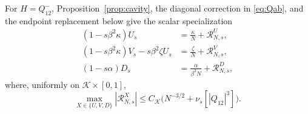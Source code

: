 \documentclass[11pt]{article}
\numberwithin{equation}{section}
\newcommand{\1}{\mathbf 1}
\newcommand{\cK}{\mathcal K}
\begin{document}
For $H=Q^-_{12}$, Proposition~\ref{prop:cavity}, the diagonal correction
in \eqref{eq:Qab}, and the endpoint replacement below give the scalar
specialization
\begin{align}
 (1-s\beta^2\kappa)U_s
 &=\frac{\kappa}{N}+\mathcal R^U_{N,s},
 \label{eq:cavity-U}\\
 (1-s\beta^2\kappa)V_s-s\beta^2\zeta U_s
 &=\frac{\zeta}{N}+\mathcal R^V_{N,s},
 \label{eq:cavity-V}\\
 (1-s\alpha)D_s
 &=\frac{\alpha}{\beta^2N}+\mathcal R^D_{N,s},
 \label{eq:cavity-D}
\end{align}
where, uniformly on $\cK\times[0,1]$,
\begin{equation}
 \max_{X\in\{U,V,D\}}|\mathcal R^X_{N,s}|
 \le C_{\cK}\bigl(N^{-3/2}+\nu_s[|Q_{12}|^3]\bigr).
 \label{eq:cavity-remainders}
\end{equation}
\end{document}
